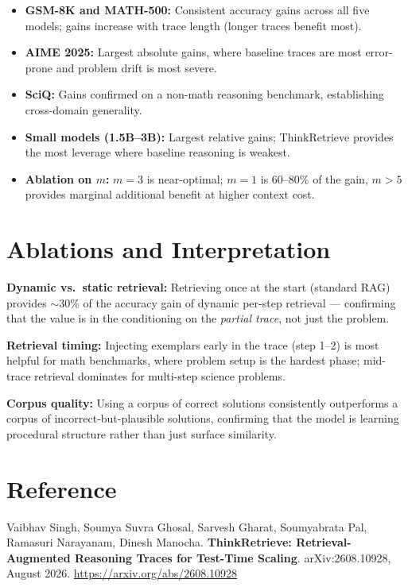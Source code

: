 \documentclass[10pt,twocolumn]{article}
\begin{document}
\begin{itemize}[itemsep=2pt,parsep=0pt]
  \item \textbf{GSM-8K and MATH-500:} Consistent accuracy gains across all five models;
    gains increase with trace length (longer traces benefit most).
  \item \textbf{AIME 2025:} Largest absolute gains, where baseline traces are most
    error-prone and problem drift is most severe.
  \item \textbf{SciQ:} Gains confirmed on a non-math reasoning benchmark, establishing
    cross-domain generality.
  \item \textbf{Small models (1.5B--3B):} Largest relative gains; ThinkRetrieve provides
    the most leverage where baseline reasoning is weakest.
  \item \textbf{Ablation on $m$:} $m=3$ is near-optimal; $m=1$ is 60--80\% of the gain,
    $m>5$ provides marginal additional benefit at higher context cost.
\end{itemize}

\section{Ablations and Interpretation}

\textbf{Dynamic vs.\ static retrieval:} Retrieving once at the start (standard RAG)
provides $\sim$30\% of the accuracy gain of dynamic per-step retrieval — confirming
that the value is in the conditioning on the \emph{partial trace}, not just the problem.

\textbf{Retrieval timing:} Injecting exemplars early in the trace (step 1--2) is most
helpful for math benchmarks, where problem setup is the hardest phase; mid-trace
retrieval dominates for multi-step science problems.

\textbf{Corpus quality:} Using a corpus of correct solutions consistently outperforms
a corpus of incorrect-but-plausible solutions, confirming that the model is learning
procedural structure rather than just surface similarity.

\section*{Reference}

Vaibhav Singh, Soumya Suvra Ghosal, Sarvesh Gharat, Soumyabrata Pal,
Ramasuri Narayanam, Dinesh Manocha.
\textbf{ThinkRetrieve: Retrieval-Augmented Reasoning Traces for Test-Time Scaling}.
arXiv:2608.10928, August 2026.
\url{https://arxiv.org/abs/2608.10928}
\end{document}
